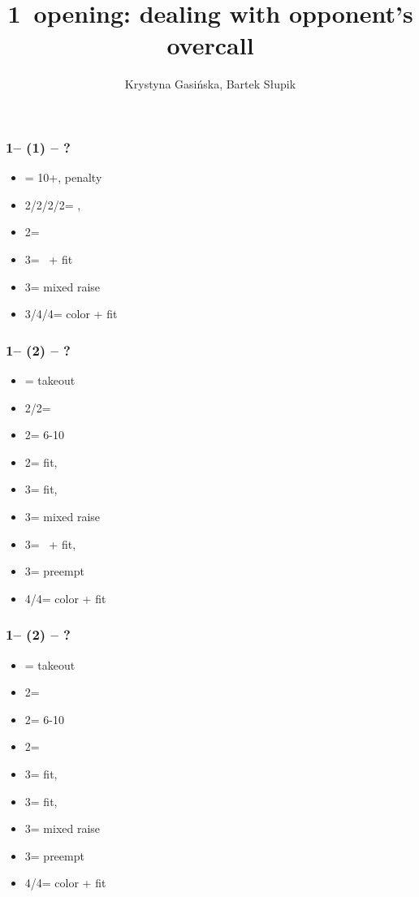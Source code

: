 \documentclass[12pt, a4paper]{article}
\title{1\spades\ opening: dealing with opponent's overcall}
\author{Krystyna Gasińska, Bartek Słupik}
\begin{document}
\maketitle


\subsubsection*{1\spades -- (1\nt) -- ?}
\begin{itemize}
    \item \dbl = 10+, penalty
    \item 2\clubs/2\diams/2\hearts/2\spades = \nat, \nf
    \item 2\nt = \minor
    \item 3\clubs = \inv\ + fit
    \item 3\diams = mixed raise
    \item 3\hearts/4\clubs/4\diams = color + fit
\end{itemize}

\subsubsection*{1\spades -- (2\clubs) -- ?}
\begin{itemize}
    \item \dbl = takeout
    \item 2\diams/2\hearts = \fonce
    \item 2\spades = 6-10
    \item 2\nt = fit, \gf
    \item 3\clubs = fit, \inv
    \item 3\diams = mixed raise
    \item 3\hearts = \hearts\ + fit, \inv
    \item 3\spades = preempt
    \item 4\diams/4\hearts = color + fit
\end{itemize}

\subsubsection*{1\spades -- (2\diams) -- ?}
\begin{itemize}
    \item \dbl = takeout
    \item 2\hearts = \fonce
    \item 2\spades = 6-10
    \item 2\nt = \clubs\ \invp
    \item 3\clubs = fit, \gf
    \item 3\diams = fit, \inv
    \item 3\hearts = mixed raise
    \item 3\spades = preempt
    \item 4\clubs/4\hearts = color + fit
\end{itemize}
\end{document}
